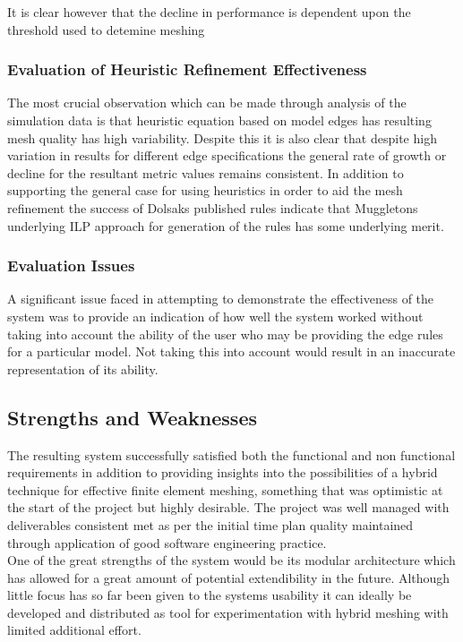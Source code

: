 It is clear however that the decline in performance is dependent upon the threshold used to detemine meshing

\subsubsection{Evaluation of Heuristic Refinement Effectiveness}
The most crucial observation which can be made through analysis of the simulation data is that heuristic equation based on model edges has resulting mesh quality has high variability. Despite this it is also clear that despite high variation in results for different edge specifications the general rate of growth or decline for the resultant metric values remains consistent. In addition to supporting the general case for using heuristics in order to aid the mesh refinement the success of Dolsaks published rules indicate that Muggletons underlying ILP approach for generation of the rules has some underlying merit. \\ 

\subsubsection{Evaluation Issues}
A significant issue faced in attempting to demonstrate the effectiveness of the system was to provide an indication of how well the system worked without taking into account the ability of the user who may be providing the edge rules for a particular model. Not taking this into account would result in an inaccurate representation of its ability.

\subsection{Strengths and Weaknesses}
The resulting system successfully satisfied both the functional and non functional requirements in addition to providing insights into the possibilities of a hybrid technique for effective finite element meshing, something that was optimistic at the start of the project but highly desirable. The project was well managed with deliverables consistent met as per the initial time plan quality maintained through application of good software engineering practice. \\

\noindent
One of the great strengths of the system would be its modular architecture which has allowed for a great amount of potential extendibility in the future. Although little focus has so far been given to the systems usability it can ideally be developed and distributed as tool for experimentation with hybrid meshing with limited additional effort. \\

